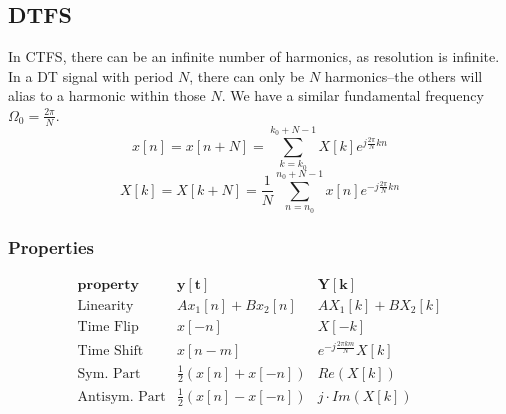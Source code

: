 \documentclass{article}
\begin{document}
\begin{multicols}{2}
\subsection{DTFS}
In CTFS, there can be an infinite number of harmonics, as resolution is infinite. In a DT signal with period $N$, there can only be $N$ harmonics--the others will alias to a harmonic within those $N$. We have a similar fundamental frequency $\Omega_0 = \frac{2\pi}{N}$.
\[ x[n] = x[n+N] = \sum_{k=k_0}^{k_0 + N -1} X[k] e^{j\frac{2\pi}{N} kn} \]
\[ X[k] = X[k+N] = \frac{1}{N}\sum_{n=n_0}^{n_0+N-1} x[n] e^{-j\frac{2\pi}{N} kn} \]
\subsubsection{Properties}
\[ \begin{array}{rcc}
	\textbf{property} & \mathbf{y[t]} & \mathbf{Y[k]} \\
	\hline
	\text{Linearity} & Ax_1[n] + Bx_2[n] & AX_1[k] + BX_2[k] \\
	\text{Time Flip} & x[-n] & X[-k] \\
	\text{Time Shift} & x[n-m] & e^{-j\frac{2\pi km}{N}} X[k] \\
	\text{Sym. Part} & \frac{1}{2}(x[n] + x[-n]) & Re(X[k]) \\
	\text{Antisym. Part} & \frac{1}{2}(x[n] - x[-n]) & j\cdot Im(X[k])
\end{array} \]

\end{multicols}
\end{document}
